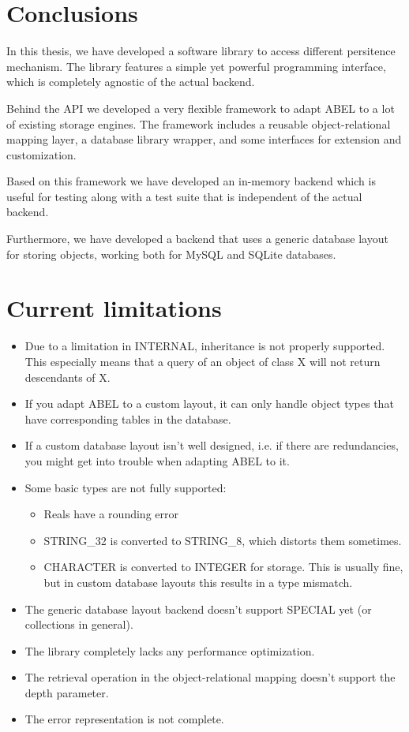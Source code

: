 \section{Conclusions}

In this thesis, we have developed a software library to access different persitence mechanism.
The library features a simple yet powerful programming interface, which is completely agnostic of the actual backend.

Behind the API we developed a very flexible framework to adapt ABEL to a lot of existing storage engines.
The framework includes a reusable object-relational mapping layer, a database library wrapper, and some interfaces for extension and customization.

Based on this framework we have developed an in-memory backend which is useful for testing along with a test suite that is independent of the actual backend.

Furthermore, we have developed a backend that uses a generic database layout for storing objects, working both for MySQL and SQLite databases.

\section{Current limitations}

\begin{itemize}
\item Due to a limitation in INTERNAL, inheritance is not properly supported.
This especially means that a query of an object of class X will not return descendants of X.
\item If you adapt ABEL to a custom layout, it can only handle object types that have corresponding tables in the database.
\item If a custom database layout isn't well designed, i.e. if there are redundancies, you might get into trouble when adapting ABEL to it.
\item Some basic types are not fully supported:
\begin{itemize}
	\item Reals have a rounding error
	\item STRING\_32 is converted to STRING\_8, which distorts them sometimes.
	\item CHARACTER is converted to INTEGER for storage.
	This is usually fine, but in custom database layouts this results in a type mismatch.
\end{itemize}
\item The generic database layout backend doesn't support SPECIAL yet (or collections in general).
\item The library completely lacks any performance optimization.
\item The retrieval operation in the object-relational mapping doesn't support the depth parameter.
\item The error representation is not complete.
\end{itemize}

